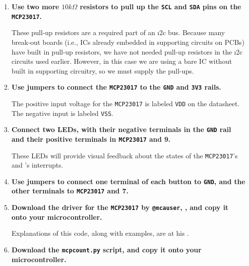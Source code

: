 \begin{enumerate}
	\item \textbf{Use two more $10k\Omega$ resistors to pull up the \texttt{SCL} and \texttt{SDA} pins on the \texttt{MCP23017}.}

	These pull-up resistors are a required part of an \i2c bus.
  Because many break-out boards (i.e., ICs already embedded in supporting circuits on PCBs) have built in pull-up resistors, we have not needed pull-up resistors in the \i2c circuits used earlier.
	However, in this case we are using a bare IC without built in supporting circuitry, so we must supply the pull-ups.

  \item \textbf{Use jumpers to connect the \texttt{MCP23017} to the \texttt{GND} and \texttt{3V3} rails.}

	The positive input voltage for the \texttt{MCP23017} is labeled \texttt{V\small{DD}} on the datasheet.
	The negative input is labeled \texttt{V\small{SS}}.

  \item \textbf{Connect two LEDs, with their negative terminals in the \texttt{GND} rail and their positive terminals in \texttt{MCP23017}  and 9.}

	These LEDs will provide visual feedback about the states of the \texttt{MCP23017}'s and 's interrupts.

  \item \textbf{Use jumpers to connect one terminal of each button to \texttt{GND}, and the other terminals to \texttt{MCP23017}  and 7.}

  \item \textbf{Download the \Micropython driver for the \texttt{MCP23017} by \texttt{@mcauser}, , and copy it onto your microcontroller.}

	Explanations of this code, along with examples, are at his .

	\item \textbf{Download the \texttt{mcp\textunderscore count.py} script, and copy it onto your microcontroller.}
	

\end{enumerate}

